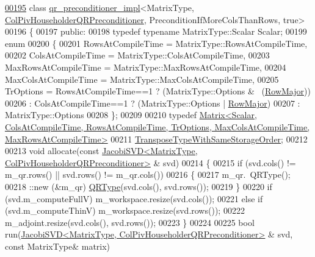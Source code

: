 \begin{DoxyCode}
\hyperlink{class_eigen_1_1internal_1_1qr__preconditioner__impl_3_01_matrix_type_00_01_col_piv_householder_q9febbd0c27c13f65b619ca11d9f35cb8}{00195} \textcolor{keyword}{class }\hyperlink{struct_eigen_1_1internal_1_1qr__preconditioner__impl}{qr\_preconditioner\_impl}<MatrixType, 
      \hyperlink{group__enums_gga46eba0d5c621f590b8cf1b53af31d56eaebc52a2365eec1df700ea97bd7af2d9a}{ColPivHouseholderQRPreconditioner}, PreconditionIfMoreColsThanRows, true>
00196 \{
00197 \textcolor{keyword}{public}:
00198   \textcolor{keyword}{typedef} \textcolor{keyword}{typename} MatrixType::Scalar Scalar;
00199   \textcolor{keyword}{enum}
00200   \{
00201     RowsAtCompileTime = MatrixType::RowsAtCompileTime,
00202     ColsAtCompileTime = MatrixType::ColsAtCompileTime,
00203     MaxRowsAtCompileTime = MatrixType::MaxRowsAtCompileTime,
00204     MaxColsAtCompileTime = MatrixType::MaxColsAtCompileTime,
00205     TrOptions = RowsAtCompileTime==1 ? (MatrixType::Options & ~(\hyperlink{group__enums_ggaacded1a18ae58b0f554751f6cdf9eb13acfcde9cd8677c5f7caf6bd603666aae3}{RowMajor}))
00206               : ColsAtCompileTime==1 ? (MatrixType::Options |   \hyperlink{group__enums_ggaacded1a18ae58b0f554751f6cdf9eb13acfcde9cd8677c5f7caf6bd603666aae3}{RowMajor})
00207               : MatrixType::Options
00208   \};
00209 
00210   \textcolor{keyword}{typedef} 
      \hyperlink{group___core___module}{Matrix<Scalar, ColsAtCompileTime, RowsAtCompileTime, TrOptions, MaxColsAtCompileTime, MaxRowsAtCompileTime>}
00211           \hyperlink{group___core___module}{TransposeTypeWithSameStorageOrder};
00212 
00213   \textcolor{keywordtype}{void} allocate(\textcolor{keyword}{const} \hyperlink{group___s_v_d___module_class_eigen_1_1_jacobi_s_v_d}{JacobiSVD<MatrixType, ColPivHouseholderQRPreconditioner>}
      & svd)
00214   \{
00215     \textcolor{keywordflow}{if} (svd.cols() != m\_qr.rows() || svd.rows() != m\_qr.cols())
00216     \{
00217       m\_qr.~QRType();
00218       ::new (&m\_qr) \hyperlink{group___q_r___module}{QRType}(svd.cols(), svd.rows());
00219     \}
00220     \textcolor{keywordflow}{if} (svd.m\_computeFullV) m\_workspace.resize(svd.cols());
00221     \textcolor{keywordflow}{else} \textcolor{keywordflow}{if} (svd.m\_computeThinV) m\_workspace.resize(svd.rows());
00222     m\_adjoint.resize(svd.cols(), svd.rows());
00223   \}
00224 
00225   \textcolor{keywordtype}{bool} run(\hyperlink{group___s_v_d___module_class_eigen_1_1_jacobi_s_v_d}{JacobiSVD<MatrixType, ColPivHouseholderQRPreconditioner>}
      & svd, \textcolor{keyword}{const} MatrixType& matrix)

\end{DoxyCode}
